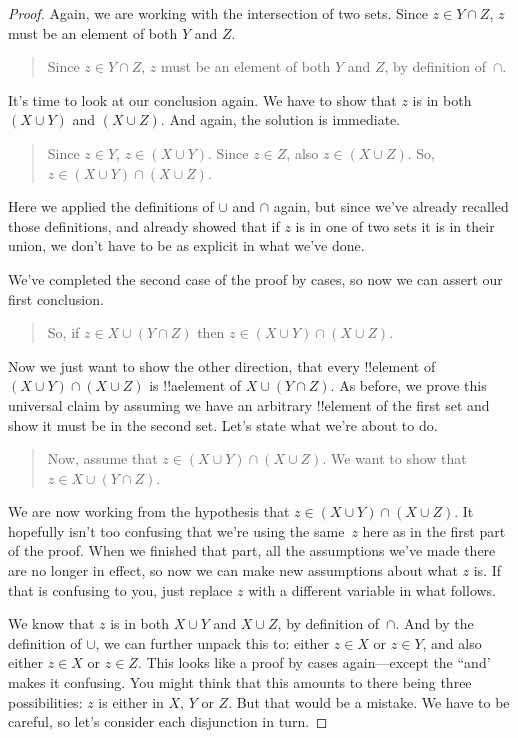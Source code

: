\documentclass[../../../include/open-logic-section]{subfiles}
\begin{document}
\begin{proof}
Again, we are working with the intersection of two sets. Since $z \in
Y \cap Z$, $z$ must be an element of both $Y$ and $Z$.

\begin{quote}
Since $z \in Y \cap Z$, $z$ must be an element of both $Y$ and $Z$, by
definition of~$\cap$.
\end{quote}

It's time to look at our conclusion again. We have to show that $z$ is
in both $(X \cup Y)$ and $(X \cup Z)$. And again, the solution is
immediate.

\begin{quote}
Since $z \in Y$, $z \in (X \cup Y)$. Since $z \in Z$, also $z \in (X
\cup Z)$.  So, $z \in (X \cup Y) \cap (X \cup Z)$.
\end{quote}

Here we applied the definitions of $\cup$ and $\cap$ again, but since
we've already recalled those definitions, and already showed that if
$z$ is in one of two sets it is in their union, we don't have to be as
explicit in what we've done.

We've completed the second case of the proof by cases, so now we can
assert our first conclusion.

\begin{quote}
So, if $z \in X \cup (Y \cap Z)$ then $z \in (X \cup Y) \cap (X \cup Z)$.
\end{quote}

Now we just want to show the other direction, that every !!{element}
of $(X \cup Y) \cap (X \cup Z)$ is !!a{element} of $X \cup (Y \cap
Z)$. As before, we prove this universal claim by assuming we have an
arbitrary !!{element} of the first set and show it must be in the
second set. Let's state what we're about to do.

\begin{quote}
Now, assume that $z \in (X \cup Y) \cap (X \cup Z)$. We want to show
that $z \in X \cup (Y \cap Z)$.
\end{quote}

We are now working from the hypothesis that $z \in (X \cup Y) \cap (X
\cup Z)$. It hopefully isn't too confusing that we're using the
same~$z$ here as in the first part of the proof.  When we finished
that part, all the assumptions we've made there are no longer in
effect, so now we can make new assumptions about what $z$ is.  If that
is confusing to you, just replace $z$ with a different variable in
what follows.

We know that $z$ is in both $X \cup Y$ and $X \cup Z$, by definition
of~$\cap$. And by the definition of $\cup$, we can further unpack this
to: either $z \in X$ or $z \in Y$, and also either $z \in X$ or $z \in
Z$. This looks like a proof by cases again---except the ``and' makes
it confusing. You might think that this amounts to there being three
possibilities: $z$ is either in $X$, $Y$ or $Z$. But that would be a
mistake.  We have to be careful, so let's consider each disjunction in
turn.


\end{proof}
\end{document}
